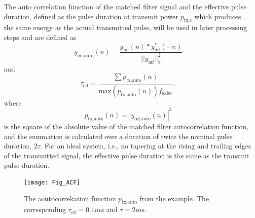\documentclass[preprint,12pt,TurnOnLineNumbers]{JASAnew}
\newcommand{\samplesymt}{n}
\newcommand{\fsdec}{f_{\textrm{s,dec}}}
\newcommand{\ptxe}{p_{\textrm{tx,e}}}
\newcommand{\tnom}{\tau}
\newcommand{\teff}{\tau_{\textrm{eff}}}
\newcommand{\ymf}{y_{\textrm{mf}}}
\newcommand{\ymfauto}{y_{\textrm{mf,auto}}}
\newcommand{\ptxauto}{p_{\textrm{tx,auto}}}
\begin{document}
The auto correlation function of the matched filter signal and the effective pulse duration, defined as the pulse duration at transmit power $\ptxe$ which produces the same energy as the actual transmitted pulse, will be used in later processing steps and are defined as
\begin{equation}
\label{eq:TXAuto}
\ymfauto(\samplesymt) = \frac{\ymf(\samplesymt)*\ymf^*(-\samplesymt)}{||\ymf||^2_2}
\end{equation}
and
\begin{equation}
\label{eq:TauEff}
\teff = \frac{\sum \ptxauto(\samplesymt)}{\textrm{max}(\ptxauto(\samplesymt))\fsdec},
\end{equation}
where
\begin{equation*}
\ptxauto(\samplesymt)  =  |\ymfauto(\samplesymt)|^2
\end{equation*}
is the square of the absolute value of the matched filter autocorrelation function, and the summation is calculated over a duration of twice the nominal pulse duration, $2\tnom$. For an ideal system, i.e., no tapering at the rising and trailing edges of the transmitted signal, the effective pulse duration is the same as the transmit pulse duration.

\begin{figure}
\texttt{[image: Fig\_ACF]}
\caption{The aoutocorrekation function $\ptxauto$ from the example. The corresponding $\teff=0.1ms$ and $\tnom=2ms$\label{fi:ACF}.}
\end{figure}
\end{document}
